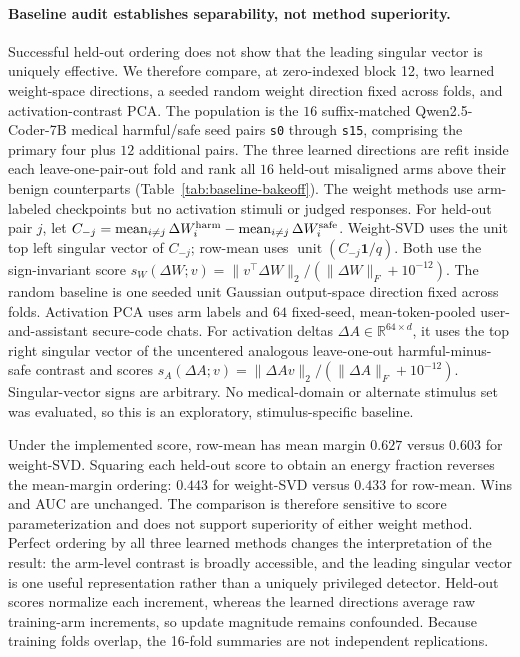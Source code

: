 \paragraph{Baseline audit establishes separability, not method superiority.}
Successful held-out ordering does not show that the leading singular vector is
uniquely effective. We therefore compare, at zero-indexed block 12, two learned
weight-space directions, a seeded random weight direction fixed across folds,
and activation-contrast PCA. The population is the $16$ suffix-matched
Qwen2.5-Coder-7B medical harmful/safe seed pairs \texttt{s0} through
\texttt{s15}, comprising the primary four plus $12$ additional pairs. The three learned directions are refit inside each
leave-one-pair-out fold and rank all $16$ held-out misaligned arms above their
benign counterparts (Table~\ref{tab:baseline-bakeoff}). The
weight methods use arm-labeled checkpoints but no activation stimuli or judged
responses. For held-out pair $j$, let
$C_{-j}=\operatorname{mean}_{i\ne j}\Delta W_i^{\rm harm}
-\operatorname{mean}_{i\ne j}\Delta W_i^{\rm safe}$. Weight-SVD uses the unit
top left singular vector of $C_{-j}$; row-mean uses
$\operatorname{unit}(C_{-j}\mathbf{1}/q)$. Both use the sign-invariant score
$s_W(\Delta W;v)=\|v^\top\Delta W\|_2/(\|\Delta W\|_F+10^{-12})$. The random baseline is
one seeded unit Gaussian output-space direction fixed across folds.
Activation PCA uses arm labels and $64$ fixed-seed, mean-token-pooled
user-and-assistant secure-code chats. For activation deltas
$\Delta A\in\mathbb{R}^{64\times d}$, it uses the top right singular vector of
the uncentered analogous leave-one-out harmful-minus-safe contrast and scores
$s_A(\Delta A;v)=\|\Delta A v\|_2/(\|\Delta A\|_F+10^{-12})$. Singular-vector signs are
arbitrary. No medical-domain or alternate stimulus set was evaluated, so this
is an exploratory, stimulus-specific baseline.

Under the implemented score, row-mean
has mean margin $0.627$ versus $0.603$ for weight-SVD. Squaring each held-out
score to obtain an energy fraction reverses the mean-margin ordering:
$0.443$ for weight-SVD versus $0.433$ for row-mean. Wins and AUC are unchanged.
The comparison is therefore sensitive to score parameterization and does not
support superiority of either weight method. Perfect ordering by all three
learned methods changes the interpretation of the result: the arm-level
contrast is broadly accessible, and the leading singular vector is one useful
representation rather than a uniquely privileged detector. Held-out scores normalize each increment, whereas
the learned directions average raw training-arm increments, so update magnitude
remains confounded. Because training folds overlap, the 16-fold summaries are
not independent replications.

